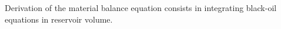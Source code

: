 \documentclass[final,authoryear,5p,times,twocolumn,10pt]{elsarticle}
\begin{document}
Derivation of the material balance equation consists in integrating black-oil equations in reservoir volume.


\end{document}
